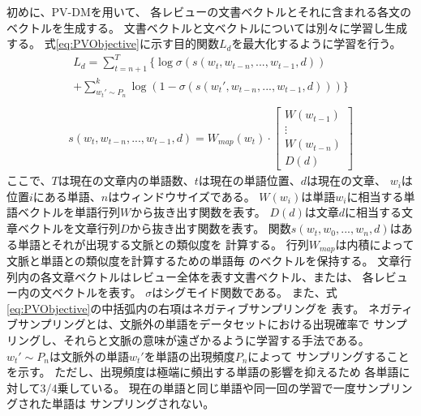 \documentclass[twocolumn,a4paper]{ltjarticle}
\begin{document}
初めに、PV-DMを用いて、
各レビューの文書ベクトルとそれに含まれる各文のベクトルを生成する。
文書ベクトルと文ベクトルについては別々に学習し生成する。
式\ref{eq:PVObjective}に示す目的関数$L_d$を最大化するように学習を行う。
\begin{multline}
  L_d = \sum^{T}_{t = n + 1} \{ \log \sigma(s(w_t, w_{t-n}, ..., w_{t-1}, d)) \\
        + \sum^{k}_{w_{t}' \sim P_n}
          \log(1 - \sigma(s(w_{t}', w_{t-n}, ..., w_{t-1}, d))) \}
  \label{eq:PVObjective} \\
\end{multline}
\begin{gather}
  s(w_t, w_{t - n}, ..., w_{t - 1}, d)
    = W_{map}(w_t)
      \cdot \begin{bmatrix} W(w_{t - 1}) \\ \vdots
      \\ W(w_{t - n}) \\ D(d) \end{bmatrix}
\end{gather}
ここで、$T$は現在の文章内の単語数、$t$は現在の単語位置、$d$は現在の文章、
$w_i$は位置$i$にある単語、$n$はウィンドウサイズである。
$W(w_i)$は単語$w_i$に相当する単語ベクトルを単語行列$W$から抜き出す関数を表す。
$D(d)$は文章$d$に相当する文章ベクトルを文章行列$D$から抜き出す関数を表す。
関数$s(w_t, w_0, ..., w_n, d)$はある単語とそれが出現する文脈との類似度を
計算する。
行列$W_{map}$は内積によって文脈と単語との類似度を計算するための単語毎
のベクトルを保持する。
文章行列内の各文章ベクトルはレビュー全体を表す文書ベクトル、または、
各レビュー内の文ベクトルを表す。
$\sigma$はシグモイド関数である。
また、式\ref{eq:PVObjective}の中括弧内の右項はネガティブサンプリングを
表す。
ネガティブサンプリングとは、文脈外の単語をデータセットにおける出現確率で
サンプリングし、それらと文脈の意味が遠ざかるように学習する手法である。
$w_{t}' \sim P_n$は文脈外の単語$w_{t}'$を単語の出現頻度$P_n$によって
サンプリングすることを示す。
ただし、出現頻度は極端に頻出する単語の影響を抑えるため
各単語に対して3/4乗している。
現在の単語と同じ単語や同一回の学習で一度サンプリングされた単語は
サンプリングされない。
\end{document}
